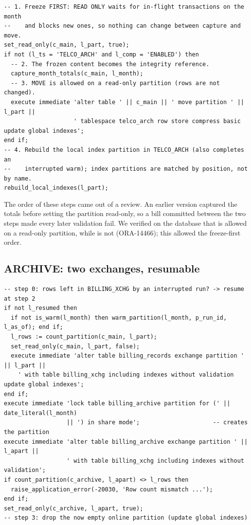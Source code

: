 \needspace{0.3\textheight}
\begin{lstlisting}[style=sql, caption={Core of \code{warm\_partition}}]
-- 1. Freeze FIRST: READ ONLY waits for in-flight transactions on the month
--    and blocks new ones, so nothing can change between capture and move.
set_read_only(c_main, l_part, true);
if not (l_ts = 'TELCO_ARCH' and l_comp = 'ENABLED') then
  -- 2. The frozen content becomes the integrity reference.
  capture_month_totals(c_main, l_month);
  -- 3. MOVE is allowed on a read-only partition (rows are not changed).
  execute immediate 'alter table ' || c_main || ' move partition ' || l_part ||
                    ' tablespace telco_arch row store compress basic update global indexes';
end if;
-- 4. Rebuild the local index partition in TELCO_ARCH (also completes an
--    interrupted warm); index partitions are matched by position, not by name.
rebuild_local_indexes(l_part);
\end{lstlisting}

The order of these steps came out of a review. An earlier version captured the totals before
setting the partition read-only, so a bill committed between the two steps made every later
validation fail. We verified on the database that  is allowed on a
read-only partition, while  is not (ORA-14466); this allowed the
freeze-first order.

\subsection{ARCHIVE: two exchanges, resumable}

\needspace{0.3\textheight}
\begin{lstlisting}[style=sql, caption={Core of \code{archive\_partition} (simplified)}]
-- step 0: rows left in BILLING_XCHG by an interrupted run? -> resume at step 2
if not l_resumed then
  if not is_warm(l_month) then warm_partition(l_month, p_run_id, l_as_of); end if;
  l_rows := count_partition(c_main, l_part);
  set_read_only(c_main, l_part, false);
  execute immediate 'alter table billing_records exchange partition ' || l_part ||
    ' with table billing_xchg including indexes without validation update global indexes';
end if;
execute immediate 'lock table billing_archive partition for (' || date_literal(l_month)
                  || ') in share mode';                     -- creates the partition
execute immediate 'alter table billing_archive exchange partition ' || l_apart ||
                  ' with table billing_xchg including indexes without validation';
if count_partition(c_archive, l_apart) <> l_rows then
  raise_application_error(-20030, 'Row count mismatch ...');
end if;
set_read_only(c_archive, l_apart, true);
-- step 3: drop the now empty online partition (update global indexes)
\end{lstlisting}

